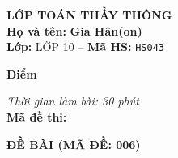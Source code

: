 \noindent
\begin{tcolorbox}[colback=white,colframe=black,arc=0mm,boxrule=0.8pt,top=4pt,bottom=4pt,left=6pt,right=6pt]
	\begin{minipage}[c]{0.44\textwidth}
		{\bfseries\large LỚP TOÁN THẦY THÔNG}\\[3pt]
		\textbf{Họ và tên:} \textbf{\large Gia Hân(on)}\\[3pt]
		\textbf{Lớp:} LỚP 10 \quad -- \quad \textbf{Mã HS:} \texttt{HS043}
	\end{minipage}
	\hfill
	\begin{minipage}[c]{0.22\textwidth}
		\begin{tcolorbox}[colback=white,colframe=black,arc=0mm,boxrule=0.6pt,height=1.8cm,halign=center,valign=top,top=2pt]
			{\bfseries\normalsize Điểm}
		\end{tcolorbox}
	\end{minipage}
	\hfill
	\begin{minipage}[c]{0.30\textwidth}
		\raggedleft
		\textit{Thời gian làm bài: 30 phút}\\[4pt]
		\textbf{Mã đề thi:} 
	\end{minipage}
\end{tcolorbox}
\vspace{0.25cm}

\noindent\textbf{\large ĐỀ BÀI (MÃ ĐỀ: 006)}
\vspace{0.1cm}

